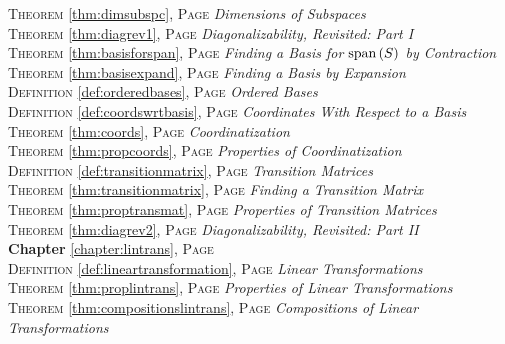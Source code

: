\begin{multicols}{2}
{         \textsc{Theorem} \ref{thm:dimsubspc}, \textsc{Page} \pageref{thm:dimsubspc} \textit{Dimensions of Subspaces} \\
         \textsc{Theorem} \ref{thm:diagrev1}, \textsc{Page} \pageref{thm:diagrev1} \textit{Diagonalizability, Revisited: Part I} \\
         \textsc{Theorem} \ref{thm:basisforspan}, \textsc{Page} \pageref{thm:basisforspan} \textit{Finding a Basis for \(\text{span\,} (S)\) by Contraction} \\
         \textsc{Theorem} \ref{thm:basisexpand}, \textsc{Page} \pageref{thm:basisexpand} \textit{Finding a Basis by Expansion} \\
         \textsc{Definition} \ref{def:orderedbases}, \textsc{Page} \pageref{def:orderedbases} \textit{Ordered Bases} \\
         \textsc{Definition} \ref{def:coordswrtbasis}, \textsc{Page} \pageref{def:coordswrtbasis} \textit{Coordinates With Respect to a Basis} \\
         \textsc{Theorem} \ref{thm:coords}, \textsc{Page} \pageref{thm:coords} \textit{Coordinatization} \\
         \textsc{Theorem} \ref{thm:propcoords}, \textsc{Page} \pageref{thm:propcoords} \textit{Properties of Coordinatization} \\
         \textsc{Definition} \ref{def:transitionmatrix}, \textsc{Page} \pageref{def:transitionmatrix} \textit{Transition Matrices} \\
         \textsc{Theorem} \ref{thm:transitionmatrix}, \textsc{Page} \pageref{thm:transitionmatrix} \textit{Finding a Transition Matrix} \\
         \textsc{Theorem} \ref{thm:proptransmat}, \textsc{Page} \pageref{thm:proptransmat} \textit{Properties of Transition Matrices} \\
         \textsc{Theorem} \ref{thm:diagrev2}, \textsc{Page} \pageref{thm:diagrev2} \textit{Diagonalizability, Revisited: Part II} \\
         \textbf{Chapter} \ref{chapter:lintrans}, \textsc{Page} \pageref{chapter:lintrans} \\
         \textsc{Definition} \ref{def:lineartransformation}, \textsc{Page} \pageref{def:lineartransformation} \textit{Linear Transformations} \\
         \textsc{Theorem} \ref{thm:proplintrans}, \textsc{Page} \pageref{thm:proplintrans} \textit{Properties of Linear Transformations} \\
         \textsc{Theorem} \ref{thm:compositionslintrans}, \textsc{Page} \pageref{thm:compositionslintrans} \textit{Compositions of Linear Transformations} \\
}
\end{multicols}
